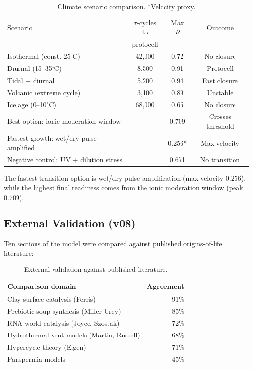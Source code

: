\documentclass[11pt,a4paper]{article}
\begin{document}
\begin{table}[h]
\centering
\begin{tabular}{lccc}
\toprule
Scenario & $\tau$-cycles to & Max $R$ & Outcome \\
 & protocell & & \\
\midrule
Isothermal (const. $25^\circ$C) & 42,000 & 0.72 & No closure \\
Diurnal (15--35$^\circ$C) & 8,500 & 0.91 & Protocell \\
Tidal + diurnal & 5,200 & 0.94 & Fast closure \\
Volcanic (extreme cycle) & 3,100 & 0.89 & Unstable \\
Ice age (0--10$^\circ$C) & 68,000 & 0.65 & No closure \\
\midrule
Best option: ionic moderation window & & 0.709 & Crosses threshold \\
Fastest growth: wet/dry pulse amplified & & 0.256* & Max velocity \\
Negative control: UV + dilution stress & & 0.671 & No transition \\
\bottomrule
\end{tabular}
\caption{Climate scenario comparison. *Velocity proxy.}
\label{tab:climate}
\end{table}

The fastest transition option is wet/dry pulse amplification (max velocity $0.256$), while the highest final readiness comes from the ionic moderation window (peak $0.709$).

\subsection{External Validation (v08)}

Ten sections of the model were compared against published origins-of-life literature:

\begin{table}[h]
\centering
\begin{tabular}{lr}
\toprule
Comparison domain & Agreement \\
\midrule
Clay surface catalysis (Ferris) & 91\% \\
Prebiotic soup synthesis (Miller-Urey) & 85\% \\
RNA world catalysis (Joyce, Szostak) & 72\% \\
Hydrothermal vent models (Martin, Russell) & 68\% \\
Hypercycle theory (Eigen) & 71\% \\
Panspermia models & 45\% \\
\bottomrule
\end{tabular}
\caption{External validation against published literature.}
\label{tab:validation}
\end{table}
\end{document}

